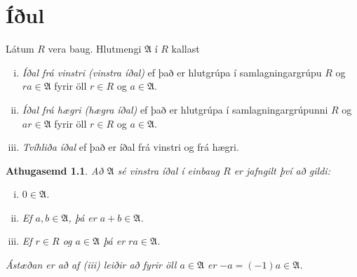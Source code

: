 \documentclass[a4paper,icelandic,11pt]{book}
\theoremstyle{plain}
\newtheorem*{ath}{Athugasemd}
\begin{document}
\chapter{Íðul}
\begin{skilgr}
  Látum $R$ vera baug. Hlutmengi $\mathfrak A$ í $R$ kallast
  \begin{enumerate} [(i)]
    \item \emph{Íðal frá vinstri (vinstra íðal)} ef það
      er hlutgrúpa í samlagningargrúpu $R$ og $ra \in\mathfrak A$ fyrir öll
      $r\in R$ og $a\in\mathfrak A$.
    \item \emph{Íðal frá hægri (hægra íðal)} ef það er
      hlutgrúpa í samlagningargrúpunni $R$ og $ar\in\mathfrak A$ fyrir öll
      $r\in R$ og $a\in\mathfrak A$.
    \item \emph{Tvíhliða íðal} ef það er íðal frá vinstri
      og frá hægri.
  \end{enumerate}
\end{skilgr}
\begin{ath}
  Að $\mathfrak A$ sé vinstra íðal í einbaug $R$ er jafngilt því að gildi:
  \begin{enumerate}[(i)]
    \item $0\in\mathfrak A$.
    \item Ef $a,b\in\mathfrak A$, þá er $a+b\in\mathfrak A$.
    \item Ef $r\in R$ og $a\in\mathfrak A$ þá er $ra\in\mathfrak A$.
  \end{enumerate}
  Ástæðan er að af (iii) leiðir að fyrir öll $a\in\mathfrak A$ er $-a =
  (-1)a\in\mathfrak A$.
\end{ath}
\end{document}
